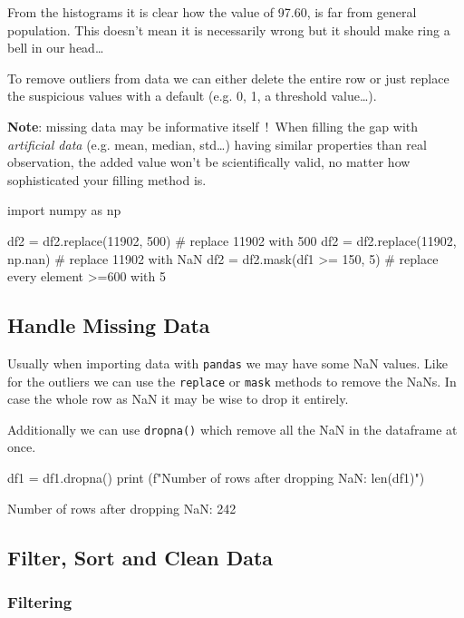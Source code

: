 From the histograms it is clear how the value of 97.60, is far from general population. This doesn't mean it is necessarily wrong but it should make ring a bell in our head\ldots

To remove outliers from data we can either delete the entire row or just replace the suspicious values with a default (e.g. 0, 1, a threshold value\ldots).

\textbf{Note}: missing data may be informative itself~!~When filling the gap with \emph{artificial data} (e.g. mean, median, std\ldots) having similar properties than real observation, the added value won't be scientifically valid, no matter how sophisticated your filling method is.

\begin{ipython}
import numpy as np

df2 = df2.replace(11902, 500) # replace 11902 with 500
df2 = df2.replace(11902, np.nan) # replace 11902 with NaN
df2 = df2.mask(df1 >= 150, 5) # replace every element >=600 with 5
\end{ipython}

\subsection{Handle Missing Data}\label{handle-missing-data}

Usually when importing data with \texttt{pandas} we may have some NaN values. Like for the outliers we can use the \texttt{replace} or \texttt{mask} methods to remove the NaNs. In case the whole row as NaN it may be wise to drop it entirely.

Additionally we can use \texttt{dropna()} which remove all the NaN in the dataframe at once.

\begin{ipython}
df1 = df1.dropna()
print (f"Number of rows after dropping NaN: {len(df1)}")
\end{ipython}
\begin{ioutput}
Number of rows after dropping NaN: 242
\end{ioutput}

\subsection{Filter, Sort and Clean Data}
\label{filter-sort-and-clean-data}

\subsubsection{Filtering}\label{filtering}

